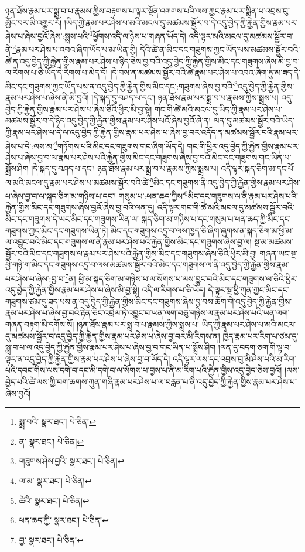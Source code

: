 ཉན་ཐོས་རྣམ་པར་སྨྲ་བ་པ་རྣམས་ཀྱིས་བརྟགས་པ་ལྟར་སྔོན་འགགས་པའི་ལས་ཀྱང་རྣམ་པར་སྨིན་པ་འབྲས་བུ་མྱོང་བར་མི་འགྱུར་རོ། །ཡིད་ཀྱི་རྣམ་པར་ཤེས་པ་མའི་མངལ་དུ་མཚམས་སྦྱོར་བ་དེ་འདུ་བྱེད་ཀྱི་རྐྱེན་གྱིས་རྣམ་པར་ཤེས་པ་ཞེས་བྱའོ་ཞེས་:སྨྲས་པའི་\footnote{སྨྲ་བའི་  སྣར་ཐང་།  པེ་ཅིན། }ཕྱོགས་འདི་ལ་ཉེས་པ་གཞན་ཡོད་དེ། འདི་ལྟར་མའི་མངལ་དུ་མཚམས་སྦྱོར་བ་ནི་\footnote{ན་  སྣར་ཐང་།  པེ་ཅིན། }རྣམ་པར་ཤེས་པ་འབའ་ཞིག་ཡོད་པ་མ་ཡིན་གྱི། དེའི་ཚེ་ན་མིང་དང་གཟུགས་ཀྱང་ཡོད་པས་མཚམས་སྦྱོར་བའི་ཚེ་ན་འདུ་བྱེད་ཀྱི་རྐྱེན་གྱིས་རྣམ་པར་ཤེས་པ་ཉིད་ཅེས་བྱ་བའི་འདུ་བྱེད་ཀྱི་རྐྱེན་གྱིས་མིང་དང་གཟུགས་ཞེས་མི་བྱ་བ་ལ་རིགས་པ་ཅི་ཡོད་དེ་རིགས་པ་མེད་དོ། །དེ་བས་ན་མཚམས་སྦྱོར་བའི་ཚེ་རྣམ་པར་ཤེས་པ་འབའ་ཞིག་ཏུ་མ་ཟད་དེ་མིང་དང་གཟུགས་ཀྱང་ཡོད་པས་ན་འདུ་བྱེད་ཀྱི་རྐྱེན་གྱིས་མིང་དང་:གཟུགས་ཞེས་བྱ་བའི་\footnote{གཟུགས་ཤེས་བྱའི་  སྣར་ཐང་།  པེ་ཅིན། }འདུ་བྱེད་ཀྱི་རྐྱེན་གྱིས་རྣམ་པར་ཤེས་པ་ཞེས་ནི་མི་བྱའོ། །དེ་སྐད་དུ་བཤད་པ་དང་། ཉན་ཐོས་རྣམ་པར་སྨྲ་བ་པ་རྣམས་ཀྱིས་སྨྲས་པ། འདུ་བྱེད་ཀྱི་རྐྱེན་གྱིས་རྣམ་པར་ཤེས་པ་ཞེས་ཅིའི་ཕྱིར་མི་བྱ་སྟེ། གང་གི་ཚེ་མའི་མངལ་དུ་ཡིད་ཀྱི་རྣམ་པར་ཤེས་པ་མཚམས་སྦྱོར་བ་དེ་ཉིད་འདུ་བྱེད་ཀྱི་རྐྱེན་གྱིས་རྣམ་པར་ཤེས་པའོ་ཞེས་བྱའོ་ཞེ་ན། ལན་དུ་མཚམས་སྦྱོར་བའི་ཡིད་ཀྱི་རྣམ་པར་ཤེས་པ་དེ་ལ་འདུ་བྱེད་ཀྱི་རྐྱེན་གྱིས་རྣམ་པར་ཤེས་པ་ཞེས་བྱ་བར་འདོད་ན་མཚམས་སྦྱོར་བའི་རྣམ་པར་ཤེས་པ་དེ་:ལས་མ་\footnote{ལ་མ་  སྣར་ཐང་།  པེ་ཅིན། }གཏོགས་པའི་མིང་དང་གཟུགས་གང་ཞིག་ཡོད་དེ། གང་གི་ཕྱིར་འདུ་བྱེད་ཀྱི་རྐྱེན་གྱིས་རྣམ་པར་ཤེས་པ་ཞེས་བྱ་བ་ལ་རྣམ་པར་ཤེས་པའི་རྐྱེན་གྱིས་མིང་དང་གཟུགས་ཞེས་བྱ་བའི་མིང་དང་གཟུགས་གང་ཡིན་པ་སྨྲོས་ཤིག །དེ་སྐད་དུ་བཤད་པ་དང་། ཉན་ཐོས་རྣམ་པར་སྨྲ་བ་པ་རྣམས་ཀྱིས་སྨྲས་པ། འདི་ལྟར་སྐད་ཅིག་མ་དང་པོ་ལ་མའི་མངལ་དུ་རྣམ་པར་ཤེས་པ་མཚམས་སྦྱོར་བའི་ཚེ་\footnote{ཚེའི་  སྣར་ཐང་།  པེ་ཅིན། }མིང་དང་གཟུགས་ནི་འདུ་བྱེད་ཀྱི་རྐྱེན་གྱིས་རྣམ་པར་ཤེས་པ་ཞེས་བྱ་བ་ལ་སྐད་ཅིག་མ་གཉིས་པ་དང་། གསུམ་པ་:ཕན་ཆད་ཀྱིས་\footnote{ཕན་ཆད་ཀྱི་  སྣར་ཐང་།  པེ་ཅིན། }མིང་དང་གཟུགས་ལ་ནི་རྣམ་པར་ཤེས་པའི་རྐྱེན་གྱིས་མིང་དང་གཟུགས་ཞེས་བྱའོ་ཞེས་བྱ་བའི་ལན་དུ། འདི་ལྟར་གང་གི་ཚེ་མའི་མངལ་དུ་མཚམས་སྦྱོར་བའི་མིང་དང་གཟུགས་དེ་ཡང་མིང་དང་གཟུགས་ཡིན་ལ། སྐད་ཅིག་མ་གཉིས་པ་དང་གསུམ་པ་ཕན་ཆད་ཀྱི་མིང་དང་གཟུགས་ཀྱང་མིང་དང་གཟུགས་ཡིན་ཏེ། མིང་དང་གཟུགས་འདྲ་བ་ལས་ཁྱད་ཅི་ཞིག་ཞུགས་ན་སྐད་ཅིག་མ་ཕྱི་མ་ལ་འབྱུང་བའི་མིང་དང་གཟུགས་ལ་ནི་རྣམ་པར་ཤེས་པའི་རྐྱེན་གྱིས་མིང་དང་གཟུགས་ཞེས་བྱ་ལ། སྔ་མ་མཚམས་སྦྱོར་བའི་མིང་དང་གཟུགས་ལ་རྣམ་པར་ཤེས་པའི་རྐྱེན་གྱིས་མིང་དང་གཟུགས་ཞེས་ཅིའི་ཕྱིར་མི་བྱ། གཞན་ཡང་སྔ་ཕྱི་གཉི་ག་མིང་དང་གཟུགས་འདྲ་བ་ལས་མཚམས་སྦྱོར་བའི་མིང་དང་གཟུགས་ལ་ནི་འདུ་བྱེད་ཀྱི་རྐྱེན་གྱིས་རྣམ་པར་ཤེས་པ་ཞེས་:བྱ་བ་\footnote{བྱ་  སྣར་ཐང་།  པེ་ཅིན། }ན། ཕྱི་མ་སྐད་ཅིག་མ་གཉིས་པ་ལ་སོགས་པ་ལས་བྱུང་བའི་མིང་དང་གཟུགས་ལ་ཅིའི་ཕྱིར་འདུ་བྱེད་ཀྱི་རྐྱེན་གྱིས་རྣམ་པར་ཤེས་པ་ཞེས་མི་བྱ་སྟེ། འདི་ལ་རིགས་པ་ཅི་ཡོད། དེ་ལྟར་སྔ་ཕྱི་ཀུན་ཀྱང་མིང་དང་གཟུགས་ཙམ་དུ་ཟད་པས་ན་འདུ་བྱེད་ཀྱི་རྐྱེན་གྱིས་མིང་དང་གཟུགས་ཞེས་བྱ་བས་ཆོག་གི་འདུ་བྱེད་ཀྱི་རྐྱེན་གྱིས་རྣམ་པར་ཤེས་པ་ཞེས་བྱ་བའི་རྟེན་ཅིང་འབྲེལ་ཏེ་འབྱུང་བ་ཡན་ལག་བཅུ་གཉིས་ལ་རྣམ་པར་ཤེས་པའི་ཡན་ལག་གཞན་བརྟག་མི་དགོས་སོ། །ཉན་ཐོས་རྣམ་པར་སྨྲ་བ་པ་རྣམས་ཀྱིས་སྨྲས་པ། ཡིད་ཀྱི་རྣམ་པར་ཤེས་པ་མའི་མངལ་དུ་མཚམས་སྦྱོར་བ་འདུ་བྱེད་ཀྱི་རྐྱེན་གྱིས་རྣམ་པར་ཤེས་པ་ཞེས་བྱ་བར་མི་རིགས་ན། ཁྱེད་རྣམ་པར་རིག་པ་ཙམ་དུ་སྨྲ་བ་པ་ལ་འདུ་བྱེད་ཀྱི་རྐྱེན་གྱིས་རྣམ་པར་ཤེས་པ་ཞེས་བྱ་བ་གང་ཡིན་པ་སྨྲོས་ཤིག །ལན་དུ་བདག་ཅག་གི་ལྟ་བ་ལྟར་ན་འདུ་བྱེད་ཀྱི་རྐྱེན་གྱིས་རྣམ་པར་ཤེས་པ་ཞེས་བྱ་བ་ཡོད་དེ། འདི་ལྟར་ལས་དང་འབྲས་བུ་མི་ཤེས་པའི་མ་རིག་པའི་དབང་གིས་ལས་དགེ་བ་དང་མི་དགེ་བ་ལ་སོགས་པ་བྱས་པ་ནི་མ་རིག་པའི་རྐྱེན་གྱིས་འདུ་བྱེད་ཅེས་བྱའོ། །ལས་བྱེད་པའི་ཚེ་ལས་ཀྱི་བག་ཆགས་ཀུན་གཞི་རྣམ་པར་ཤེས་པ་ལ་བརླན་པ་ནི་འདུ་བྱེད་ཀྱི་རྐྱེན་གྱིས་རྣམ་པར་ཤེས་པ་ཞེས་བྱའོ། 